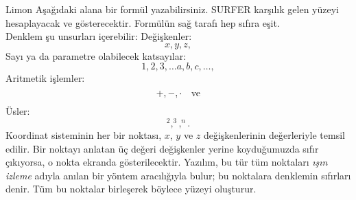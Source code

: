 \begin{surferPage}{Limon}
Aşağıdaki alana bir formül yazabilirsiniz. SURFER karşılık gelen yüzeyi hesaplayacak ve gösterecektir. Formülün sağ tarafı hep sıfıra eşit.
\\
Denklem şu unsurları içerebilir:
\newline
Değişkenler:
\[x, y, z, \]
Sayı ya da parametre olabilecek katsayılar:
\[1, 2, 3, \dots a, b, c, \dots, \]
Aritmetik işlemler:
\[+,  - , \cdot \quad \textnormal{ve} \]
Üsler:
\[ ^2, ^3, ^n .\]
Koordinat sisteminin her bir noktası, $x$, $y$ ve $z$ değişkenlerinin değerleriyle temsil edilir. Bir noktayı anlatan üç değeri değişkenler yerine koyduğumuzda sıfır çıkıyorsa, o nokta ekranda gösterilecektir. Yazılım, bu tür tüm noktaları \textit{ışın izleme} adıyla anılan bir yöntem aracılığıyla bulur; bu noktalara denklemin sıfırları denir. Tüm bu noktalar birleşerek böylece yüzeyi oluşturur.
\end{surferPage}
